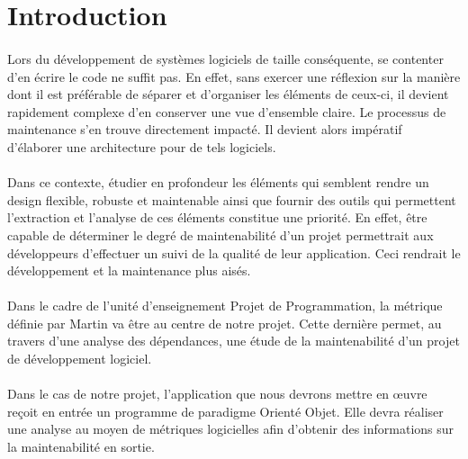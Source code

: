 \documentclass{scrartcl}
\begin{document}

\section{Introduction}
    
    \paragraph{}Lors du développement de systèmes logiciels de taille conséquente, se contenter d'en écrire le code ne suffit pas. En effet, sans exercer une réflexion sur la manière dont il est préférable de séparer et d'organiser les éléments de ceux-ci, il devient rapidement complexe d'en conserver une vue d'ensemble claire. Le processus de maintenance s'en trouve directement impacté. Il devient alors impératif d'élaborer une architecture pour de tels logiciels.


    \paragraph{}Dans ce contexte, étudier en profondeur les éléments qui semblent rendre un design flexible, robuste et maintenable ainsi que fournir des outils qui permettent l'extraction et l'analyse de ces éléments constitue une priorité. En effet, être capable de déterminer le degré de maintenabilité d'un projet permettrait aux développeurs d'effectuer un suivi de la qualité de leur application. Ceci rendrait le développement et la maintenance plus aisés.

    \paragraph{}Dans le cadre de l'unité d'enseignement \og Projet de Programmation\fg, la métrique définie par Martin\cite{Martin:1994} va être au centre de notre projet. Cette dernière permet, au travers d'une analyse des dépendances, une étude de la maintenabilité d'un projet de développement logiciel.

    \paragraph{}Dans le cas de notre projet, l'application que nous devrons mettre en œuvre reçoit en entrée un programme de paradigme Orienté Objet. Elle devra réaliser une analyse au moyen de métriques logicielles afin d'obtenir des informations sur la maintenabilité en sortie.
\end{document}
